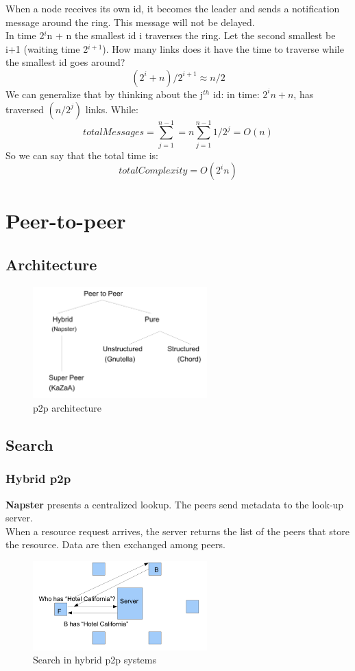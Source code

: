 \documentclass[paper=a4, fontsize=11pt]{scrartcl} %
\numberwithin{equation}{section} %
\numberwithin{figure}{section} %
\numberwithin{table}{section} %
\begin{document}
When a node receives its own id, it becomes the leader and sends a notification message around the ring. This message will not be delayed.\\
In time 2$^i$n + n the smallest id i traverses the ring. Let the second smallest be i+1 (waiting time 2$^{i+1}$). How many links does it have the time to traverse while the smallest id goes around? $$(2^i + n)/ 2^{i+1} \approx n/2$$
We can generalize that by thinking about the j$^{th}$ id: in time: $2^in + n$, has traversed $(n/2^j)$ links.
While: $$totalMessages = \sum_{j = 1}^{n-1} = n\sum_{j = 1}^{n-1}1/2^j=O(n)$$ 
So we can say that the total time is:$$totalComplexity = O(2^in)$$

\section*{Peer-to-peer}
\subsection*{Architecture}
\begin{figure}[H]
  \centering
  \includegraphics[width=0.6\textwidth]{img/p2p.png}
  \caption{p2p architecture}
  \label{fig:boat1}
\end{figure}

\subsection*{Search}
\subsubsection*{Hybrid p2p}
\textbf{Napster} presents a centralized lookup. The peers send metadata to the look-up server.\\
When a resource request arrives, the server returns the list of the peers that store the resource. Data are then exchanged among peers.
 \begin{figure}[H]
  \centering
  \includegraphics[width=0.6\textwidth]{img/search_n.png}
  \caption{Search in hybrid p2p systems}
  \label{fig:boat1}
\end{figure}
\end{document}
